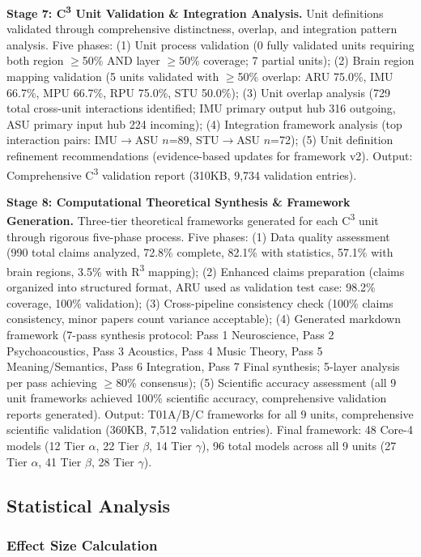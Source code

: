 \documentclass[9pt,onecolumn]{article}
\begin{document}
\textbf{Stage 7: C\textsuperscript{3} Unit Validation \& Integration Analysis.} Unit definitions validated through comprehensive distinctness, overlap, and integration pattern analysis. Five phases: (1) Unit process validation (0 fully validated units requiring both region $\geq$50\% AND layer $\geq$50\% coverage; 7 partial units); (2) Brain region mapping validation (5 units validated with $\geq$50\% overlap: ARU 75.0\%, IMU 66.7\%, MPU 66.7\%, RPU 75.0\%, STU 50.0\%); (3) Unit overlap analysis (729 total cross-unit interactions identified; IMU primary output hub 316 outgoing, ASU primary input hub 224 incoming); (4) Integration framework analysis (top interaction pairs: IMU$\rightarrow$ASU $n$=89, STU$\rightarrow$ASU $n$=72); (5) Unit definition refinement recommendations (evidence-based updates for framework v2). Output: Comprehensive C\textsuperscript{3} validation report (310KB, 9,734 validation entries).

\textbf{Stage 8: Computational Theoretical Synthesis \& Framework Generation.} Three-tier theoretical frameworks generated for each C\textsuperscript{3} unit through rigorous five-phase process. Five phases: (1) Data quality assessment (990 total claims analyzed, 72.8\% complete, 82.1\% with statistics, 57.1\% with brain regions, 3.5\% with R\textsuperscript{3} mapping); (2) Enhanced claims preparation (claims organized into structured format, ARU used as validation test case: 98.2\% coverage, 100\% validation); (3) Cross-pipeline consistency check (100\% claims consistency, minor papers count variance acceptable); (4) Generated markdown framework (7-pass synthesis protocol: Pass 1 Neuroscience, Pass 2 Psychoacoustics, Pass 3 Acoustics, Pass 4 Music Theory, Pass 5 Meaning/Semantics, Pass 6 Integration, Pass 7 Final synthesis; 5-layer analysis per pass achieving $\geq$80\% consensus); (5) Scientific accuracy assessment (all 9 unit frameworks achieved 100\% scientific accuracy, comprehensive validation reports generated). Output: T01A/B/C frameworks for all 9 units, comprehensive scientific validation (360KB, 7,512 validation entries). Final framework: 48 Core-4 models (12 Tier $\alpha$, 22 Tier $\beta$, 14 Tier $\gamma$), 96 total models across all 9 units (27 Tier $\alpha$, 41 Tier $\beta$, 28 Tier $\gamma$).

\subsection{Statistical Analysis}

\subsubsection{Effect Size Calculation}
\end{document}
